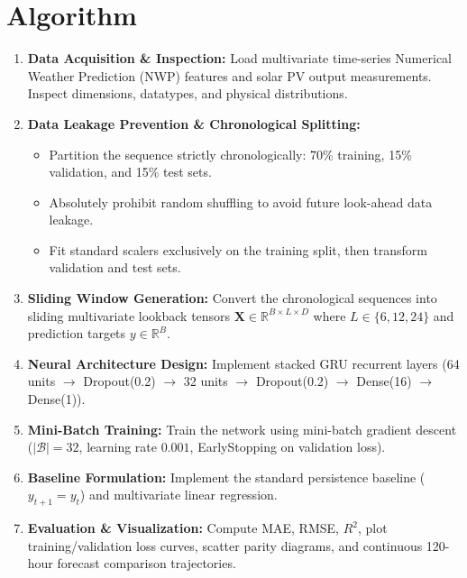 \documentclass[12pt,a4paper]{article}
\begin{document}
\section*{Algorithm}
\begin{enumerate}
    \item \textbf{Data Acquisition \& Inspection:} Load multivariate time-series Numerical Weather Prediction (NWP) features and solar PV output measurements. Inspect dimensions, datatypes, and physical distributions.
    \item \textbf{Data Leakage Prevention \& Chronological Splitting:}
    \begin{itemize}
        \item Partition the sequence strictly chronologically: 70\% training, 15\% validation, and 15\% test sets.
        \item Absolutely prohibit random shuffling to avoid future look-ahead data leakage.
        \item Fit standard scalers exclusively on the training split, then transform validation and test sets.
    \end{itemize}
    \item \textbf{Sliding Window Generation:} Convert the chronological sequences into sliding multivariate lookback tensors $\mathbf{X} \in \mathbb{R}^{B \times L \times D}$ where $L \in \{6, 12, 24\}$ and prediction targets $y \in \mathbb{R}^B$.
    \item \textbf{Neural Architecture Design:} Implement stacked GRU recurrent layers (64 units $\rightarrow$ Dropout(0.2) $\rightarrow$ 32 units $\rightarrow$ Dropout(0.2) $\rightarrow$ Dense(16) $\rightarrow$ Dense(1)).
    \item \textbf{Mini-Batch Training:} Train the network using mini-batch gradient descent ($|\mathcal{B}|=32$, learning rate $0.001$, EarlyStopping on validation loss).
    \item \textbf{Baseline Formulation:} Implement the standard persistence baseline ($y_{t+1} = y_t$) and multivariate linear regression.
    \item \textbf{Evaluation \& Visualization:} Compute MAE, RMSE, $R^2$, plot training/validation loss curves, scatter parity diagrams, and continuous 120-hour forecast comparison trajectories.
\end{enumerate}
\end{document}
